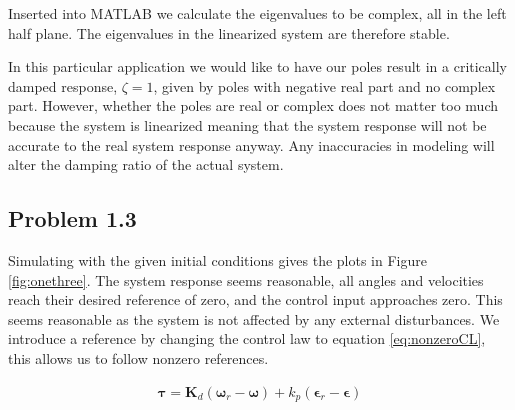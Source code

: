 Inserted into MATLAB we calculate the eigenvalues to be complex, all in the left half plane. The eigenvalues in the linearized system are therefore stable.

In this particular application we would like to have our poles result in a critically damped response, $\zeta = 1$, given by poles with negative real part and no complex part\cite{regtek}. However, whether the poles are real or complex does not matter too much because the system is linearized meaning that the system response will not be accurate to the real system response anyway. Any inaccuracies in modeling will alter the damping ratio of the actual system. 

\subsection*{Problem 1.3}

Simulating with the given initial conditions gives the plots in Figure \ref{fig:onethree}. The system response seems reasonable, all angles and velocities reach their desired reference of zero, and the control input approaches zero. This seems reasonable as the system is not affected by any external disturbances. We introduce a reference by changing the control law to equation \ref{eq:nonzeroCL}, this allows us to follow nonzero references.

\begin{align}\label{eq:nonzeroCL}
    \boldsymbol{\tau} = \boldsymbol{K}_d(\boldsymbol{\omega}_r -\boldsymbol{\omega}) + k_p(\boldsymbol{\epsilon}_r -\boldsymbol{\epsilon})
\end{align}


